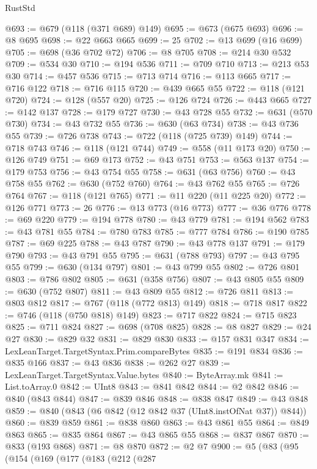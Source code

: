 \begin{lexlean}{RustStd}
\begin{coremodule}
@693 := @679 (@118 (@371 @689) @149)
@695 := @673 (@675 @693)
@696 := @8 @695
@698 := @22 @663 @665
@699 := 25
@702 := @13 @699 (@16 @699)
@705 := @698 (@36 @702 @72)
@706 := @8 @705
@708 := @214 @30 @532
@709 := @534 @30
@710 := @194 @536
@711 := @709 @710
@713 := @213 @53 @30
@714 := @457 @536
@715 := @713 @714
@716 := @113 @665
@717 := @716 @122
@718 := @716 @115
@720 := @439 @665 @55
@722 := @118 (@121 @720)
@724 := @128 (@557 @20)
@725 := @126 @724
@726 := @443 @665
@727 := @142 @137
@728 := @179 @727
@730 := @43 @728 @55
@732 := @631 (@570 @730)
@734 := @43 @732 @55
@736 := @630 (@63 @734)
@738 := @43 @736 @55
@739 := @726 @738
@743 := @722 (@118 (@725 @739) @149)
@744 := @718 @743
@746 := @118 (@121 @744)
@749 := @558 (@11 @173 @20)
@750 := @126 @749
@751 := @69 @173
@752 := @43 @751
@753 := @563 @137
@754 := @179 @753
@756 := @43 @754 @55
@758 := @631 (@63 @756)
@760 := @43 @758 @55
@762 := @630 (@752 @760)
@764 := @43 @762 @55
@765 := @726 @764
@767 := @118 (@121 @765)
@771 := @11 @220 (@11 @225 @20)
@772 := @126 @771
@773 := 26
@776 := @13 @773 (@16 @773)
@777 := @36 @776
@778 := @69 @220
@779 := @194 @778
@780 := @43 @779
@781 := @194 @562
@783 := @43 @781 @55
@784 := @780 @783
@785 := @777 @784
@786 := @190 @785
@787 := @69 @225
@788 := @43 @787
@790 := @43 @778 @137
@791 := @179 @790
@793 := @43 @791 @55
@795 := @631 (@788 @793)
@797 := @43 @795 @55
@799 := @630 (@134 @797)
@801 := @43 @799 @55
@802 := @726 @801
@803 := @786 @802
@805 := @631 (@358 @756)
@807 := @43 @805 @55
@809 := @630 (@752 @807)
@811 := @43 @809 @55
@812 := @726 @811
@813 := @803 @812
@817 := @767 (@118 (@772 @813) @149)
@818 := @718 @817
@822 := @746 (@118 (@750 @818) @149)
@823 := @717 @822
@824 := @715 @823
@825 := @711 @824
@827 := @698 (@708 @825)
@828 := @8 @827
@829 := @24 @27
@830 := @829 @32
@831 := @829 @830
@833 := @157 @831 @347
@834 := LexLeanTarget.TargetSyntax.Prim.compareBytes
@835 := @191 @834
@836 := @835 @166
@837 := @43 @836
@838 := @262 @27
@839 := LexLeanTarget.TargetSyntax.Value.bytes
@840 := ByteArray.mk
@841 := List.toArray.{0}
@842 := UInt8
@843 := @841 @842
@844 := @2 @842
@846 := @840 (@843 @844)
@847 := @839 @846
@848 := @838 @847
@849 := @43 @848
@859 := @840 (@843 (@6 @842 (@12 @842 @37 (UInt8.instOfNat @37)) @844))
@860 := @839 @859
@861 := @838 @860
@863 := @43 @861 @55
@864 := @849 @863
@865 := @835 @864
@867 := @43 @865 @55
@868 := @837 @867
@870 := @833 (@193 @868)
@871 := @8 @870
@872 := @2 @7
@900 := @5
    (@83
      (@95
        (@154
          (@169
            (@177
              (@183
                (@212
                  (@287

\end{coremodule}
\end{lexlean}
